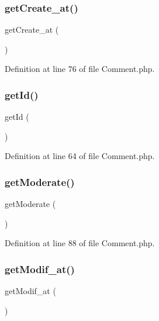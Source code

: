 \subsubsection{get\+Create\+\_\+at()}
{\footnotesize\ttfamily get\+Create\+\_\+at (\begin{DoxyParamCaption}{ }\end{DoxyParamCaption})}



Definition at line 76 of file Comment.\+php.

\mbox{\label{class_src_1_1_entity_1_1_comment_a12251d0c022e9e21c137a105ff683f13}} 
\subsubsection{get\+Id()}
{\footnotesize\ttfamily get\+Id (\begin{DoxyParamCaption}{ }\end{DoxyParamCaption})}



Definition at line 64 of file Comment.\+php.

\mbox{\label{class_src_1_1_entity_1_1_comment_a6d3a6a148bf0c8752548e7e7ab149abb}} 
\subsubsection{get\+Moderate()}
{\footnotesize\ttfamily get\+Moderate (\begin{DoxyParamCaption}{ }\end{DoxyParamCaption})}



Definition at line 88 of file Comment.\+php.

\mbox{\label{class_src_1_1_entity_1_1_comment_a5858386cc69be9863ed37e0ceb2697b1}} 
\subsubsection{get\+Modif\+\_\+at()}
{\footnotesize\ttfamily get\+Modif\+\_\+at (\begin{DoxyParamCaption}{ }\end{DoxyParamCaption})}



